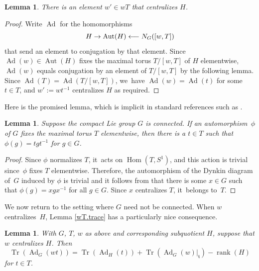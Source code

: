 \documentclass[JEP,XML,SOM,Unicode,NoFloatCountersInSection,published]{cedram}
\newcommand\from{\mathchoice{\longleftarrow}{\leftarrow}{\leftarrow}{\leftarrow}}
\newtheorem{lem}[equation]{Lemma}
\theoremstyle{definition}
\newcommand{\mft}{\mathfrak{t}}
\DeclareMathOperator{\Tr}{Tr}
\DeclareMathOperator{\Ad}{Ad}
\DeclareMathOperator{\Aut}{Aut}
\DeclareMathOperator{\rank}{rank}
\DeclareMathOperator{\Hom}{Hom}
\begin{document}
\begin{lem} \label{H.centralize}
There is an element $w' \in wT$ that centralizes $H$.
\end{lem}

\begin{proof}
Write $\Ad$ for the homomorphisms
\[
H \to \Aut(H) \from N_G([w,T])
\]
that send an element to conjugation by that element.
Since $\Ad(w)\in \Aut(H)$ fixes the maximal torus $T/[w,T]$ of $H$ elementwise, $\Ad(w)$ equals conjugation by an element of $T/[w,T]$ by the following lemma. Since $\Ad(T) = \Ad(T/[w,T])$, we~have $\Ad(w) = \Ad(t)$ for some $t \in T$, and $w' := wt^{-1}$ centralizes $H$ as required.
\end{proof}

Here is the promised lemma, which is implicit in standard references such as \cite[\S{IX.4.10}]{Bou:g7}.

\begin{lem}
Suppose the compact Lie group $G$ is connected. If an automorphism~$\phi$ of $G$ fixes the maximal torus $T$ elementwise, then there is a $t \in T$ such that $\phi(g) = tgt^{-1}$ for $g \in G$.
\end{lem}

\begin{proof}
Since $\phi$ normalizes $T$, it~acts on $\Hom(T, S^1)$, and this action is trivial since~$\phi$ fixes $T$ elementwise. Therefore, the automorphism of the Dynkin diagram of~$G$ induced by $\phi$ is trivial and it follows from \cite[\S{IX.4.10}, Eq.~(16)]{Bou:g7} that there is some $x \in G$ such that $\phi(g) = xgx^{-1}$ for all $g \in G$. Since $x$ centralizes $T$, it~belongs to~$T$.
\end{proof}

We now return to the setting where $G$ need not be connected. When $w$ centralizes~$H$, Lemma \ref{wT.trace} has a particularly nice consequence.

\begin{lem} \label{H.trace}
With $G$, $T$, $w$ as above and corresponding subquotient $H$, suppose that $w$ centralizes $H$. Then
\[
\Tr(\Ad_G(wt))
=
\Tr(\Ad_H(t))+\Tr(\Ad_G(w)|_\mft)-\rank(H)
\]
for $t \in T$.
\end{lem}
\end{document}
